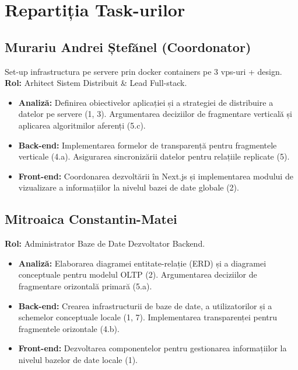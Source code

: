 \chapter{Repartiția Task-urilor}

\label{sec:repartitie_taskuri}

\section{Murariu Andrei Ștefănel (Coordonator)}
Set-up infrastructura pe servere prin docker containers pe 3 vps-uri + design.
\textbf{Rol:} Arhitect Sistem Distribuit \& Lead Full-stack.
\begin{itemize}
\item \textbf{Analiză:} Definirea obiectivelor aplicației și a strategiei de distribuire a datelor pe servere (1, 3). Argumentarea deciziilor de fragmentare verticală și aplicarea algoritmilor aferenți (5.c).
\item \textbf{Back-end:} Implementarea formelor de transparență pentru fragmentele verticale (4.a). Asigurarea sincronizării datelor pentru relațiile replicate (5).
\item \textbf{Front-end:} Coordonarea dezvoltării în Next.js și implementarea modului de vizualizare a informațiilor la nivelul bazei de date globale (2).
\end{itemize}

\section{Mitroaica Constantin-Matei}
\textbf{Rol:} Administrator Baze de Date  Dezvoltator Backend.
\begin{itemize}
\item \textbf{Analiză:} Elaborarea diagramei entitate-relație (ERD) și a diagramei conceptuale pentru modelul OLTP (2). Argumentarea deciziilor de fragmentare orizontală primară (5.a).
\item \textbf{Back-end:} Crearea infrastructurii de baze de date, a utilizatorilor și a schemelor conceptuale locale (1, 7). Implementarea transparenței pentru fragmentele orizontale (4.b).
\item \textbf{Front-end:} Dezvoltarea componentelor pentru gestionarea informațiilor la nivelul bazelor de date locale (1).
\end{itemize}

